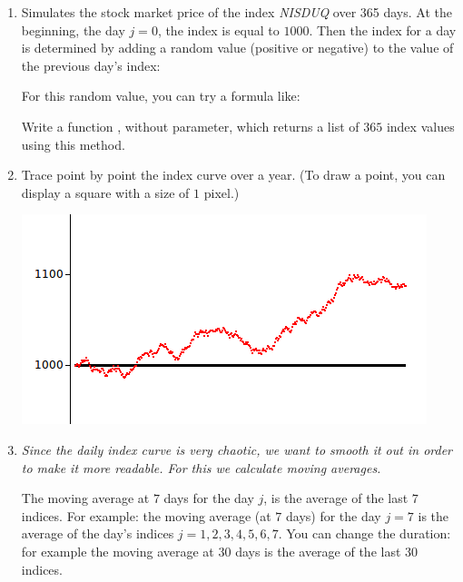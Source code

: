 \documentclass[11pt,class=report,crop=false]{standalone}
\begin{document}
\begin{activite}



\begin{enumerate}
  \item Simulates the stock market price of the index \emph{NISDUQ} over 365 days.
  At the beginning, the day $j=0$, the index is equal to $1000$. Then the index for a day is determined by adding a random value (positive or negative) to the value of the previous day's index:  
  
  For this random value, you can try a formula like:  
  
  Write a function , without parameter, which returns a list of $365$ index values using this method.
  
  \item Trace point by point the index curve over a year. (To draw a point, you can display a square with a size of $1$ pixel.)
  
\begin{center}
\includegraphics[scale=\myscale,scale=0.7]{screen-stat-5a}
\end{center}

   \item \emph{Since the daily index curve is very chaotic, we want to smooth it out in order to make it more readable. For this we calculate moving averages.}
   
   The moving average at $7$ days for the day $j$, is the average of the last $7$ indices. For example: the moving average (at $7$ days) for the day $j = 7$ is the average of the day's indices $j=1,2,3,4,5,6,7$. You can change the duration: for example the moving average at $30$ days is the average of the last $30$ indices.
   

\end{enumerate}
\end{activite}
\end{document}
